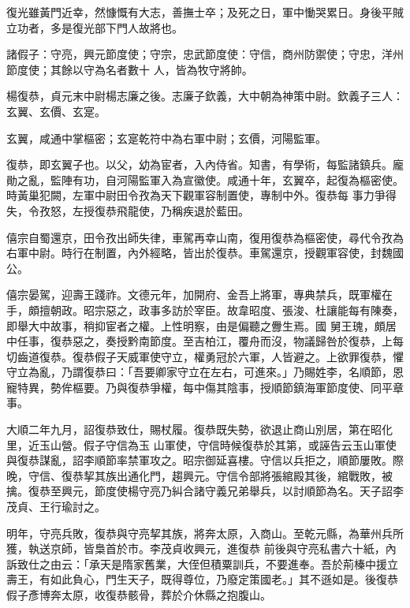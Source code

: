 \begin{pinyinscope}
 復光雖黃門近幸，然慷慨有大志，善撫士卒；及死之日，軍中慟哭累日。身後平賊立功者，多是復光部下門人故將也。



 諸假子：守亮，興元節度使；守宗，忠武節度使：守信，商州防禦使；守忠，洋州節度使；其餘以守為名者數十
 人，皆為牧守將帥。



 楊復恭，貞元末中尉楊志廉之後。志廉子欽義，大中朝為神策中尉。欽義子三人：玄翼、玄價、玄寔。



 玄翼，咸通中掌樞密；玄寔乾符中為右軍中尉；玄價，河陽監軍。



 復恭，即玄翼子也。以父，幼為宦者，入內侍省。知書，有學術，每監諸鎮兵。龐勛之亂，監陣有功，自河陽監軍入為宣徽使。咸通十年，玄翼卒，起復為樞密使。時黃巢犯闕，左軍中尉田令孜為天下觀軍容制置使，專制中外。復恭每
 事力爭得失，令孜怒，左授復恭飛龍使，乃稱疾退於藍田。



 僖宗自蜀還京，田令孜出師失律，車駕再幸山南，復用復恭為樞密使，尋代令孜為右軍中尉。時行在制置，內外經略，皆出於復恭。車駕還京，授觀軍容使，封魏國公。



 僖宗晏駕，迎壽王踐祚。文德元年，加開府、金吾上將軍，專典禁兵，既軍權在手，頗擅朝政。昭宗惡之，政事多訪於宰臣。故韋昭度、張浚、杜讓能每有陳奏，即舉大中故事，稍抑宦者之權。上性明察，由是偏聽之釁生焉。國
 舅王瑰，頗居中任事，復恭惡之，奏授黔南節度。至吉柏江，覆舟而沒，物議歸咎於復恭，上每切齒道復恭。復恭假子天威軍使守立，權勇冠於六軍，人皆避之。上欲罪復恭，懼守立為亂，乃謂復恭曰：「吾要卿家守立在左右，可進來。」乃賜姓李，名順節，恩寵特異，勢侔樞要。乃與復恭爭權，每中傷其陰事，授順節鎮海軍節度使、同平章事。



 大順二年九月，詔復恭致仕，賜杖履。復恭既失勢，欲退止商山別居，第在昭化里，近玉山營。假子守信為玉
 山軍使，守信時候復恭於其第，或誣告云玉山軍使與復恭謀亂，詔李順節率禁軍攻之。昭宗御延喜樓。守信以兵拒之，順節屢敗。際晚，守信、復恭挈其族出通化門，趨興元。守信令部將張綰殿其後，綰戰敗，被擒。復恭至興元，節度使楊守亮乃糾合諸守義兄弟舉兵，以討順節為名。天子詔李茂貞、王行瑜討之。



 明年，守亮兵敗，復恭與守亮挈其族，將奔太原，入商山。至乾元縣，為華州兵所獲，執送京師，皆梟首於市。李茂貞收興元，進復恭
 前後與守亮私書六十紙，內訴致仕之由云：「承天是隋家舊業，大侄但積粟訓兵，不要進奉。吾於荊榛中援立壽王，有如此負心，門生天子，既得尊位，乃廢定策國老。」其不遜如是。後復恭假子彥博奔太原，收復恭骸骨，葬於介休縣之抱腹山。




\end{pinyinscope}
